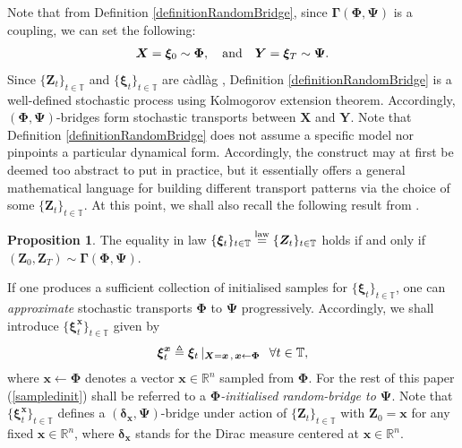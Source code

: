 \documentclass{article}
\newcommand{\cadlag}{{c\`adl\`ag }}
\def\R{\mathbb{R}}
\def\T{\mathbb{T}}
\def\law{\overset{\textnormal{law}}{=}}
\def\xib{\boldsymbol{\xi}}
\theoremstyle{definition}
\newtheorem{proposition}{Proposition}[section]
\begin{document}
Note that from Definition \ref{definitionRandomBridge}, since $\boldsymbol{\Gamma}(\boldsymbol{\Phi},\boldsymbol{\Psi})$ is a coupling, we can set the following:
\begin{align}
\boldsymbol{X}  = \xib_0 \sim \boldsymbol{\Phi}, \quad \text{and} \quad \boldsymbol{Y} = \xib_T  \sim \boldsymbol{\Psi}. \notag
\end{align}
Since $\{\boldsymbol{Z}_{t}\}_{t\in\T}$ and $\{\xib_{t}\}_{t\in\T}$ are \cadlag, Definition \ref{definitionRandomBridge} is a well-defined stochastic process using Kolmogorov extension theorem. Accordingly, $(\boldsymbol{\Phi}, \boldsymbol{\Psi})$-bridges form stochastic transports between $\boldsymbol{X}$ and $\boldsymbol{Y}$. Note that Definition \ref{definitionRandomBridge} does not assume a specific model nor pinpoints a particular dynamical form. Accordingly, the construct may at first be deemed too abstract to put in practice, but it essentially offers a general mathematical language for building different transport patterns via the choice of some $\{\boldsymbol{Z}_t\}_{t\in\T}$. At this point, we shall also recall the following result from \cite{goria_random-bridges_2025}.
\begin{proposition}
The equality in law $\{\xib_{t}\}_{t\in\T} \law\{\boldsymbol{Z}_{t}\}_{t\in\T}$ holds if and only if $(\boldsymbol{Z}_0,\boldsymbol{Z}_T) \sim \boldsymbol{\Gamma}(\boldsymbol{\Phi},\boldsymbol{\Psi})$.
\end{proposition}
If one produces a sufficient collection of initialised samples for $\{\xib_{t}\}_{t\in\T}$, one can \emph{approximate} stochastic transports $\boldsymbol{\Phi}$ to $\boldsymbol{\Psi}$ progressively. Accordingly, we shall introduce $\{\xib^{\boldsymbol{x}}_t\}_{t\in\T}$ given by
\begin{align}
\xib^{\boldsymbol{x}}_t \triangleq  \xib_t \, |_{\boldsymbol{X} = \boldsymbol{x} \, , \,\boldsymbol{x} \leftarrow \boldsymbol{\Phi}} \hspace{0.1in} \forall t\in\T, \label{sampledinit}
\end{align}
where $\boldsymbol{x} \leftarrow \boldsymbol{\Phi}$ denotes a vector $\boldsymbol{x}\in\R^n$ sampled from $\boldsymbol{\Phi}$. For the rest of this paper (\ref{sampledinit}) shall be referred to a \emph{$\boldsymbol{\Phi}$-initialised random-bridge to $\boldsymbol{\Psi}$}. Note that $\{\xib^{\boldsymbol{x}}_t\}_{t\in\T}$ defines a $(\boldsymbol{\delta}_{\boldsymbol{x}}, \boldsymbol{\Psi})$-bridge under action of $\{\boldsymbol{Z}_t\}_{t\in\T}$ with $\boldsymbol{Z}_0 =\boldsymbol{x}$ for any fixed $\boldsymbol{x}\in\R^n$, where $\boldsymbol{\delta}_{\boldsymbol{x}}$ stands for the Dirac measure centered at $\boldsymbol{x}\in\R^n$.
\end{document}
